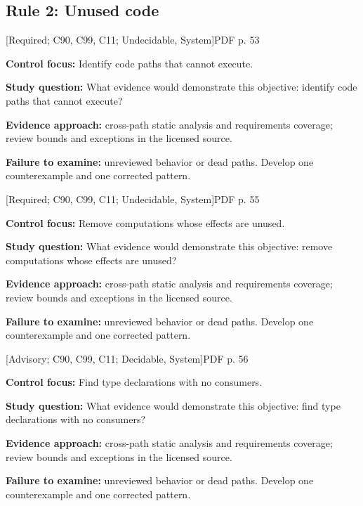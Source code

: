 \documentclass[10pt,letterpaper]{article}
\begin{document}
\subsection{Rule 2: Unused code}
 \textsf{\footnotesize [Required; C90, C99, C11; Undecidable, System]}\hfill{\footnotesize PDF p. 53}\par
\textbf{Control focus:} Identify code paths that cannot execute.\par
\textbf{Study question:} What evidence would demonstrate this objective: identify code paths that cannot execute?\par
\textbf{Evidence approach:} cross-path static analysis and requirements coverage; review bounds and exceptions in the licensed source.\par
\textbf{Failure to examine:} unreviewed behavior or dead paths. Develop one counterexample and one corrected pattern.\par
\smallskip
{}
 \textsf{\footnotesize [Required; C90, C99, C11; Undecidable, System]}\hfill{\footnotesize PDF p. 55}\par
\textbf{Control focus:} Remove computations whose effects are unused.\par
\textbf{Study question:} What evidence would demonstrate this objective: remove computations whose effects are unused?\par
\textbf{Evidence approach:} cross-path static analysis and requirements coverage; review bounds and exceptions in the licensed source.\par
\textbf{Failure to examine:} unreviewed behavior or dead paths. Develop one counterexample and one corrected pattern.\par
\smallskip
{}
 \textsf{\footnotesize [Advisory; C90, C99, C11; Decidable, System]}\hfill{\footnotesize PDF p. 56}\par
\textbf{Control focus:} Find type declarations with no consumers.\par
\textbf{Study question:} What evidence would demonstrate this objective: find type declarations with no consumers?\par
\textbf{Evidence approach:} cross-path static analysis and requirements coverage; review bounds and exceptions in the licensed source.\par
\textbf{Failure to examine:} unreviewed behavior or dead paths. Develop one counterexample and one corrected pattern.\par
\end{document}
